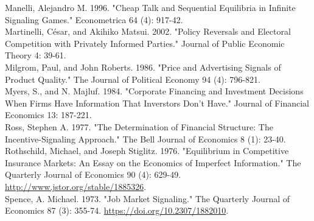 \documentclass[10pt]{article}
\begin{document}
Manelli, Alejandro M. 1996. "Cheap Talk and Sequential Equilibria in Infinite Signaling Games." Econometrica 64 (4): 917-42.\\
Martinelli, César, and Akihiko Matsui. 2002. "Policy Reversals and Electoral Competition with Privately Informed Parties." Journal of Public Economic Theory 4: 39-61.\\
Milgrom, Paul, and John Roberts. 1986. "Price and Advertising Signals of Product Quality." The Journal of Political Economy 94 (4): 796-821.\\
Myers, S., and N. Majluf. 1984. "Corporate Financing and Investment Decisions When Firms Have Information That Inverstors Don't Have." Journal of Financial Economics 13: 187-221.\\
Ross, Stephen A. 1977. "The Determination of Financial Structure: The Incentive-Signaling Approach." The Bell Journal of Economics 8 (1): 23-40.\\
Rothschild, Michael, and Joseph Stiglitz. 1976. "Equilibrium in Competitive Insurance Markets: An Essay on the Economics of Imperfect Information." The Quarterly Journal of Economics 90 (4): 629-49. \href{http://www.jstor.org/stable/1885326}{http://www.jstor.org/stable/1885326}.\\
Spence, A. Michael. 1973. "Job Market Signaling." The Quarterly Journal of Economics 87 (3): 355-74. \href{https://doi.org/10.2307/1882010}{https://doi.org/10.2307/1882010}.
\end{document}
